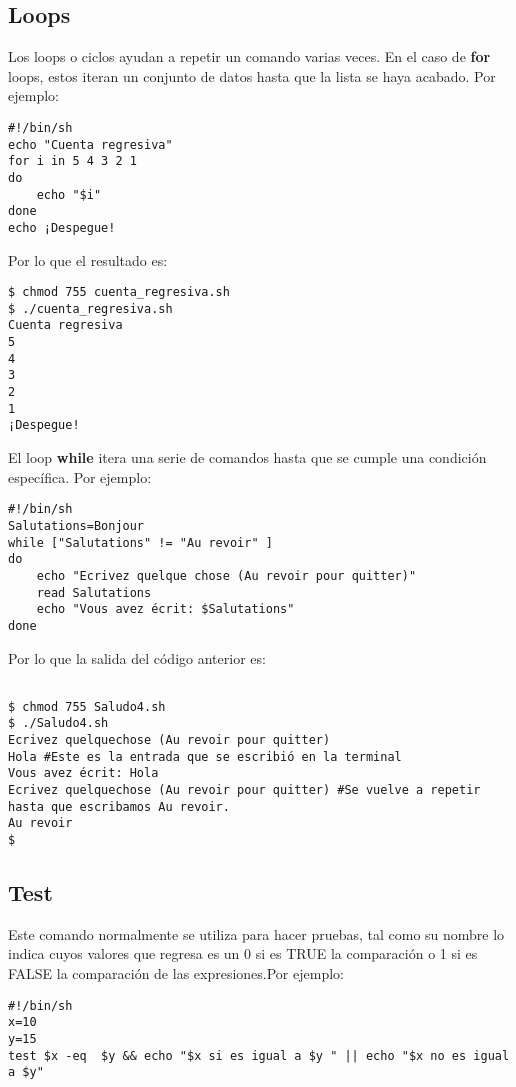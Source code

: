 \documentclass[a4paper]{article}
\begin{document}
\subsection{Loops}

Los loops o ciclos ayudan a repetir un comando varias veces. En el caso de \textbf{for} loops, estos iteran un conjunto de datos hasta que la lista se haya acabado. Por ejemplo:


\begin{verbatim}
#!/bin/sh
echo "Cuenta regresiva"
for i in 5 4 3 2 1
do 
    echo "$i"
done
echo ¡Despegue!
\end{verbatim}

Por lo que el resultado es:


\begin{verbatim}
$ chmod 755 cuenta_regresiva.sh
$ ./cuenta_regresiva.sh
Cuenta regresiva
5
4
3
2
1
¡Despegue!
\end{verbatim}

El loop \textbf{while} itera una serie de comandos hasta que se cumple una condición específica. Por ejemplo:

\begin{verbatim}
#!/bin/sh
Salutations=Bonjour
while ["Salutations" != "Au revoir" ]
do
	echo "Ecrivez quelque chose (Au revoir pour quitter)"
    read Salutations
    echo "Vous avez écrit: $Salutations"
done
\end{verbatim}

Por lo que la salida del código anterior es:

\begin{verbatim}

$ chmod 755 Saludo4.sh
$ ./Saludo4.sh
Ecrivez quelquechose (Au revoir pour quitter) 
Hola #Este es la entrada que se escribió en la terminal
Vous avez écrit: Hola
Ecrivez quelquechose (Au revoir pour quitter) #Se vuelve a repetir hasta que escribamos Au revoir.
Au revoir
$

\end{verbatim}

\subsection{Test}

Este comando normalmente se utiliza para hacer pruebas, tal como su nombre lo indica cuyos valores que regresa es un 0 si es TRUE la comparación o 1 si es FALSE la comparación de las expresiones.Por ejemplo:

\begin{verbatim}
#!/bin/sh
x=10
y=15
test $x -eq  $y && echo "$x si es igual a $y " || echo "$x no es igual a $y"
\end{verbatim}
\end{document}
